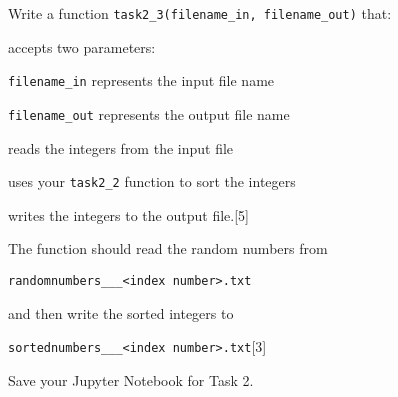 \begin{onehalfspace}
\noindent Write a function \texttt{task2\_3(filename\_in, filename\_out)}
that:
\end{onehalfspace}
\begin{itemize}
\begin{onehalfspace}
\item accepts two parameters:
\end{onehalfspace}
\begin{itemize}
\begin{onehalfspace}
\item \texttt{filename\_in} represents the input file name
\item \texttt{filename\_out} represents the output file name
\end{onehalfspace}
\end{itemize}
\begin{onehalfspace}
\item reads the integers from the input file
\item uses your \texttt{task2\_2} function to sort the integers
\item writes the integers to the output file.\hfill{}{[}5{]}
\end{onehalfspace}
\end{itemize}
\begin{onehalfspace}
\noindent The function should read the random numbers from

\noindent \texttt{randomnumbers\_<your name>\_<centre number>\_<index
number>.txt}

\noindent and then write the sorted integers to

\noindent \texttt{sortednumbers\_<your name>\_<centre number>\_<index
number>.txt}\hfill{}{[}3{]}

\noindent Save your Jupyter Notebook for Task 2.
\end{onehalfspace}